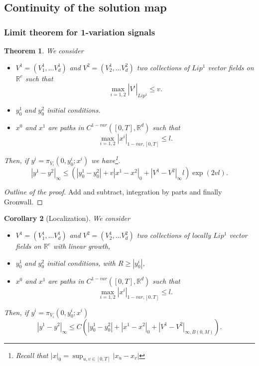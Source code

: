 \documentclass{article}
\newcommand{\R}{\mathbb{R}}
\newtheorem{theorem}{Theorem}
\newtheorem{corollary}[theorem]{Corollary}
\begin{document}
\subsection{Continuity of the solution map}

\subsubsection{Limit theorem for 1-variation signals}

\begin{theorem}
    We consider
    \begin{itemize}
        \item $V^1 = (V_1^1, \ldots V^1_d)$ and $V^2 = (V_2^1, \ldots V^2_d)$ two collections of $Lip^1$ vector fields on $\R^e$ such that
        \begin{equation}
            \max_{i=1,2} |V^i|_{Lip^1} \leq v.
        \end{equation}
        \item $y_0^1$ and $y_0^2$ initial conditions.
        \item $x^0$ and $x^1$ are paths in $C^{1-var}([0,T], \R^d)$ such that 
        \begin{equation}
            \max_{i=1,2} |x^i|_{1-var, [0,T]} \leq l.
        \end{equation} 
    \end{itemize}
    Then, if $y^i = \pi_{V_i}(0, y_0^i; x^i)$ we have\footnote{Recall that $|x|_0 = \sup_{u,v \in [0,T]} |x_u - x_v|$}.
    \begin{equation}
        |y^1 - y^2|_\infty \leq \left( |y_0^1 - y_0^2| + v |x^1 - x^2|_0 + |V^1 - V^2|_\infty l \right) \exp(2vl).
    \end{equation}
\end{theorem}
\begin{proof}[Outline of the proof]
    Add and subtract, integration by parts and finally Gronwall.
\end{proof}

\begin{corollary}[Localization]
      We consider
    \begin{itemize}
        \item $V^1 = (V_1^1, \ldots V^1_d)$ and $V^2 = (V_2^1, \ldots V^2_d)$ two collections of locally $Lip^1$ vector fields on $\R^e$ with linear growth,
        \item $y_0^1$ and $y_0^2$ initial conditions, with $R \geq |y_0^i|,$
        \item $x^0$ and $x^1$ are paths in $C^{1-var}([0,T], \R^d)$ such that 
        \begin{equation}
            \max_{i=1,2} |x^i|_{1-var, [0,T]} \leq l.
        \end{equation} 
    \end{itemize}
    Then, if $y^i = \pi_{V_i}(0, y_0^i; x^i)$
     \begin{equation}
        |y^1 - y^2|_\infty \leq C \left( |y_0^1 - y_0^2| + |x^1 - x^2|_0 + |V^1 - V^2|_{\infty, B(0,M)} \right).
    \end{equation}
\end{corollary}
\end{document}
